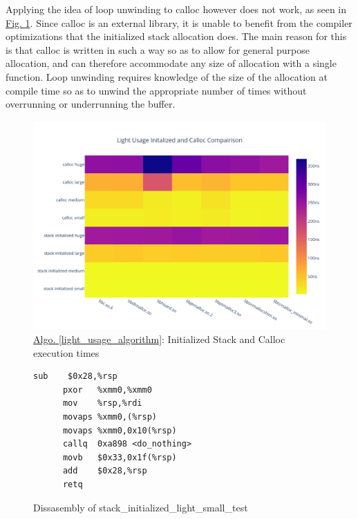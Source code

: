 \documentclass[letterpaper, 10 pt, conference]{ieeeconf}  %
\begin{document}
Applying the idea of loop unwinding to calloc however does not work, as seen in \hyperref[algo1_init_calloc_hist]{Fig. \ref*{algo1_init_calloc_hist}}.
Since calloc is an external library, it is unable to benefit from the compiler optimizations that the initialized stack allocation does.
The main reason for this is that calloc is written in such a way so as to allow for general purpose allocation, and can therefore accommodate any size of allocation with a single function.
Loop unwinding requires knowledge of the size of the allocation at compile time so as to unwind the appropriate number of times without overrunning or underrunning the buffer. 
\begin{figure}[tbh!]
  \centering
  \includegraphics[width=\columnwidth]{graphs/light_init_calloc_hist.png}
  \caption{ \hyperref[light_usage_algorithm]{Algo. \ref{light_usage_algorithm}}: Initialized Stack and Calloc execution times }
  \label{algo1_init_calloc_hist}
\end{figure} 

\begin{figure}[tbh!]
  \centering
    \begin{lstlisting}[language={[x64]Assembler},frame=single]
      sub    $0x28,%rsp
      pxor   %xmm0,%xmm0
      mov    %rsp,%rdi
      movaps %xmm0,(%rsp)
      movaps %xmm0,0x10(%rsp)
      callq  0xa898 <do_nothing>
      movb   $0x33,0x1f(%rsp)
      add    $0x28,%rsp
      retq   
    \end{lstlisting}
  \caption{ Dissasembly of stack\_initialized\_light\_small\_test }
  \label{algo1_init_small_lst}
\end{figure}
\end{document}
